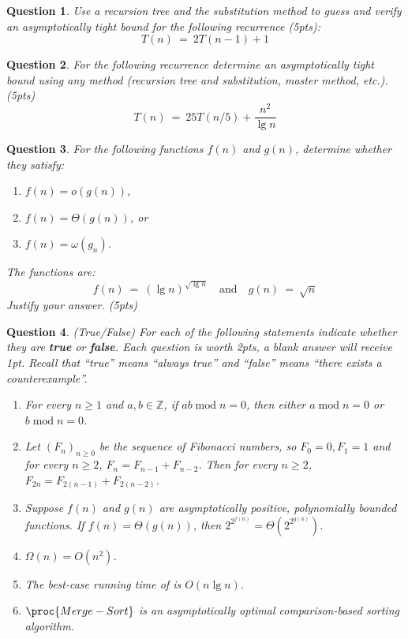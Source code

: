 \documentclass[11pt]{amsart}
\theoremstyle{theorem}
\newtheorem{question}{Question}
\newcommand\Z{\mathbb{Z}}
\newcommand\Mod{\operatorname{mod}}
\begin{document}
\begin{question}
Use a recursion tree and the substitution method to guess and verify an asymptotically tight bound for the following recurrence (5pts):
\[
T(n) \ = \ 2T(n-1)+1
\]
\end{question}


\begin{question}
For the following recurrence determine an asymptotically tight bound using any method (recursion tree and substitution, master method, etc.). (5pts)
\[
T(n) \ = \ 25T(n/5)+\frac{n^2}{\operatorname{lg}n}
\]
\end{question}

\begin{question}
For the following functions $f(n)$ and $g(n)$, determine whether they satisfy:
\begin{enumerate}
\item $f(n)=o(g(n))$,
\item $f(n)=\Theta(g(n))$, or
\item $f(n)=\omega(g_n)$.
\end{enumerate}
The functions are:
\[
f(n) \ = \ (\operatorname{lg}n)^{\sqrt{\operatorname{lg}n}}\quad \text{and}\quad g(n) \ = \ \sqrt{n}
\]
Justify your answer. (5pts)
\end{question}

\begin{question}
(True/False) For each of the following statements indicate whether they are \textbf{true} or \textbf{false}. Each question is worth 2pts, a blank answer will receive 1pt. Recall that ``true'' means ``always true'' and ``false'' means ``there exists a counterexample''.
\begin{enumerate}
\item For every $n\geq 1$ and $a,b\in\Z$, if $ab\Mod n=0$, then either $a\Mod n=0$ or $b\Mod n=0$.
\item Let $(F_n)_{n\geq 0}$ be the sequence of Fibonacci numbers, so $F_0=0, F_1=1$ and for every $n\geq 2$, $F_{n}=F_{n-1}+F_{n-2}$. Then for every $n\geq 2$, $F_{2n}=F_{2(n-1)}+F_{2(n-2)}$.
\item Suppose $f(n)$ and $g(n)$ are asymptotically positive, polynomially bounded functions. If $f(n)=\Theta(g(n))$, then $2^{2^{f(n)}}=\Theta(2^{2^{g(n)}})$.
\item $\Omega(n)=O(n^2)$.
\item The best-case running time of  is $O(n\operatorname{lg}n)$.
\item $\proc{Merge-Sort}$ is an asymptotically optimal comparison-based sorting algorithm.
\end{enumerate}
\end{question}
\end{document}
